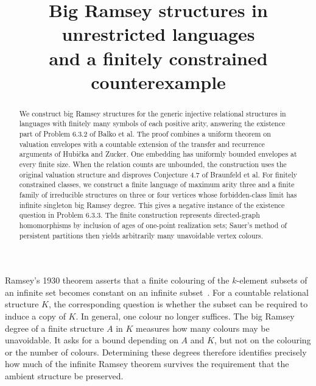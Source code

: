 \documentclass{article}
\numberwithin{equation}{section}
\theoremstyle{definition}
\begin{document}
\title{Big Ramsey structures in unrestricted languages\texorpdfstring{\\}{}
and a finitely constrained counterexample}
\begin{abstract}
We construct big Ramsey structures for the generic injective relational
structures in languages with finitely many symbols of each positive arity,
answering the existence part of Problem 6.3.2 of Balko et al.
The proof combines a uniform theorem on valuation envelopes with a countable
extension of the transfer and recurrence arguments of Hubi\v cka and Zucker.
One embedding has uniformly bounded envelopes at every finite size.
When the relation counts are unbounded, the construction uses the original
valuation structure and disproves Conjecture 4.7 of Braunfeld et al.
For finitely constrained classes, we construct a finite language of maximum
arity three and a finite family of irreducible structures on three or four
vertices whose forbidden-class limit has infinite singleton big Ramsey
degree. This gives a negative instance of the existence question in
Problem 6.3.3. The finite construction represents directed-graph
homomorphisms by inclusion of ages of one-point realization sets; Sauer's
method of persistent partitions then yields arbitrarily many unavoidable
vertex colours.
\end{abstract}
\maketitle

Ramsey's 1930 theorem asserts that a finite colouring of the $k$-element subsets
of an infinite set becomes constant on an infinite subset~\cite{Ramsey}.
For a countable relational structure $K$, the corresponding question is
whether the subset can be required to induce a copy of $K$. In general,
one colour no longer suffices. The big Ramsey degree of a finite structure
$A$ in $K$ measures how many colours may be unavoidable. It asks for a
bound depending on $A$ and $K$, but not on the colouring or the number of
colours. Determining these degrees therefore identifies precisely how
much of the infinite Ramsey theorem survives the requirement that the
ambient structure be preserved.
\end{document}

